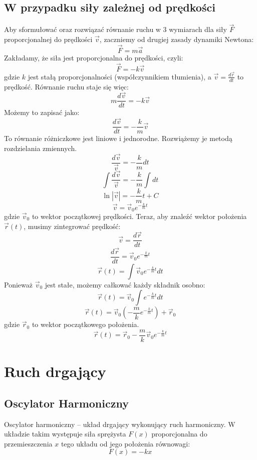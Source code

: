 \documentclass{article}
\theoremstyle{definition}
\theoremstyle{definition}
\theoremstyle{definition}
\theoremstyle{definition}
\begin{document}
\subsection{W przypadku siły zależnej od prędkości}
Aby sformułować oraz rozwiązać równanie ruchu w 3 wymiarach dla siły \( \vec{F} \) proporcjonalnej do prędkości \( \vec{v} \), zaczniemy od drugiej zasady dynamiki Newtona:
\[ \vec{F} = m \vec{a} \]
Zakładamy, że siła jest proporcjonalna do prędkości, czyli:
\[ \vec{F} = -k \vec{v} \]
gdzie \( k \) jest stałą proporcjonalności (współczynnikiem tłumienia), a \( \vec{v} = \frac{d\vec{r}}{dt} \) to prędkość. Równanie ruchu staje się więc:
\[ m \frac{d\vec{v}}{dt} = -k \vec{v} \]
Możemy to zapisać jako:
\[ \frac{d\vec{v}}{dt} = -\frac{k}{m} \vec{v} \]
To równanie różniczkowe jest liniowe i jednorodne. Rozwiążemy je metodą rozdzielania zmiennych.
\[ \frac{d\vec{v}}{\vec{v}} = -\frac{k}{m} dt \]
\[ \int \frac{d\vec{v}}{\vec{v}} = -\frac{k}{m} \int dt \]
\[ \ln|\vec{v}| = -\frac{k}{m} t + C \]
\[ \vec{v} = \vec{v}_0 e^{-\frac{k}{m} t} \]
gdzie \( \vec{v}_0 \) to wektor początkowej prędkości.
Teraz, aby znaleźć wektor położenia \( \vec{r}(t) \), musimy zintegrować prędkość:
\[ \vec{v} = \frac{d\vec{r}}{dt} \]
\[ \frac{d\vec{r}}{dt} = \vec{v}_0 e^{-\frac{k}{m} t} \]
\[ \vec{r}(t) = \int \vec{v}_0 e^{-\frac{k}{m} t} dt \]
Ponieważ \(\vec{v}_0\) jest stałe, możemy całkować każdy składnik osobno:
\[ \vec{r}(t) = \vec{v}_0 \int e^{-\frac{k}{m} t} dt \]
\[ \vec{r}(t) = \vec{v}_0 \left( -\frac{m}{k} e^{-\frac{k}{m} t} \right) + \vec{r}_0 \]
gdzie \( \vec{r}_0 \) to wektor początkowego położenia.
\[
\boxed{
\vec{r}(t) = \vec{r}_0 - \frac{m}{k} \vec{v}_0 e^{-\frac{k}{m} t}
}
\]

\section{Ruch drgający}
\subsection{Oscylator Harmoniczny}
Oscylator harmoniczny – układ drgający wykonujący ruch harmoniczny.
W układzie takim występuje siła sprężysta $F(x)$ proporcjonalna do przemieszczenia $x$ tego układu od jego położenia równowagi: 
\[ F(x) = -kx \]
\end{document}
